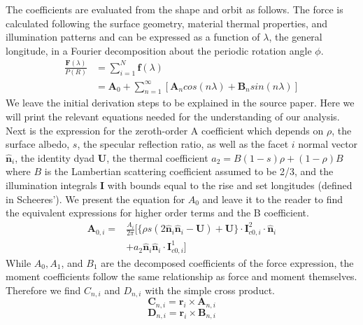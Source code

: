 \documentclass[12pt,notitlepage]{article}
\begin{document}
The coefficients are evaluated from the shape and orbit as follows. 
The force is calculated following the surface geometry, material thermal properties, and illumination patterns and can be expressed as a function of $\lambda$, the general longitude, in a Fourier decomposition about the periodic rotation angle $\phi$. 
\begin{equation}
    \begin{split}
    \frac{\mathbf{F}(\lambda)}{P(R)} &= \sum^{N}_{i=1}\mathbf{f}(\lambda) \\
    & = \mathbf{A}_0 + \sum^{\infty}_{n=1}[\mathbf{A}_n cos(n\lambda) + \mathbf{B}_n sin(n\lambda)]
    \end{split}
\end{equation}
We leave the initial derivation steps to be explained in the source paper. Here we will print the relevant equations needed for the understanding of our analysis. Next is the expression for the zeroth-order A coefficient which depends on $\rho$, the surface albedo, $s$, the specular reflection ratio, as well as the facet $i$ normal vector $\mathbf{\hat{n}}_i$, the identity dyad $\mathbf{U}$, the thermal coefficient $a_2 = B(1-s)\rho + (1-\rho)B$ where $B$ is the Lambertian scattering coefficient assumed to be 2/3, and the illumination integrals $\mathbf{I}$ with bounds equal to the rise and set longitudes (defined in Scheeres'). We present the equation for $A_0$ and leave it to the reader to find the equivalent expressions for higher order terms and the B coefficient.   
\begin{equation}
    \begin{split}
    \mathbf{A}_{0,i} = &\frac{A_i}{2\pi} \Big[\Big\{\rho s (2\mathbf{\hat{n}}_i\mathbf{\hat{n}}_i - \mathbf{U}) +\mathbf{U}  \Big\}\cdot \mathbf{I}^2_{c0,i} \cdot \mathbf{\hat{n}}_i \\
    & + a_2 \mathbf{\hat{n}}_i \mathbf{\hat{n}}_i \cdot \mathbf{I}^1_{c0,i}\Big]
    \end{split}
\end{equation}
While $A_0, A_1$, and $B_1$ are the decomposed coefficients of the force expression, the moment coefficients follow the same relationship as force and moment themselves. Therefore we find $C_{n,i}$ and $D_{n,i}$ with the simple cross product. 
\begin{equation}
    \mathbf{C}_{n,i} = \mathbf{r}_i \times \mathbf{A}_{n,i}
\end{equation} 
\begin{equation}
    \mathbf{D}_{n,i} = \mathbf{r}_i \times \mathbf{B}_{n,i}
\end{equation}
\end{document}
